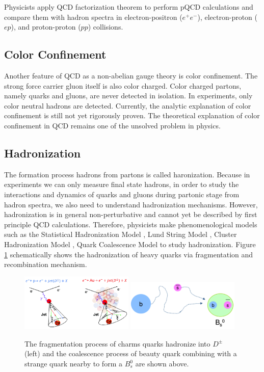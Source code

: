 Physicists apply QCD factorization theorem to perform pQCD calculations and compare them with hadron spectra in electron-positron ($e^+e^-$), electron-proton ($ep$), and proton-proton ($pp$) collisions.

\subsection{Color Confinement}

Another feature of QCD as a non-abelian gauge theory is color confinement. The strong force carrier gluon itself is also color charged. Color charged partons, namely quarks and gluons, are never detected in isolation. In experiments, only color neutral hadrons are detected. Currently, the analytic explanation of color confinement is still not yet rigorously proven. The theoretical explanation of color confinement in QCD remains one of the unsolved problem in physics. 

\subsection{Hadronization}

The formation process hadrons from partons is called haronization. Because in experiments we can only measure final state hadrons, in order to study the interactions and dynamics of quarks and gluons during partonic stage from hadron spectra, we also need to understand hadronization mechanisms. However, hadronization is in general non-perturbative and cannot yet be described by first principle QCD calculations. Therefore, physicists make phenomenological models such as the Statistical Hadronization Model \cite{SHM}, Lund String Model \cite{LSM}, Cluster Hadronization Model \cite{CHM}, Quark Coalescence Model \cite{QCM} to study hadronization. Figure \ref{HadMech} schematically shows the hadronization of heavy quarks via fragmentation and recombination mechanism.

\begin{figure}[hbtp]
\begin{center}
\includegraphics[width=0.48\textwidth]{Figures/Chapter1/FragCartoon.png}
\includegraphics[width=0.48\textwidth]{Figures/Chapter1/CoalCartoon.png}
\caption{The fragmentation process of charms quarks hadronize into $D^\pm$ (left) and the coalescence process of beauty quark combining with a strange quark nearby to form a $B^0_s$ are shown above.}
\label{HadMech}
\end{center}
\end{figure} 


